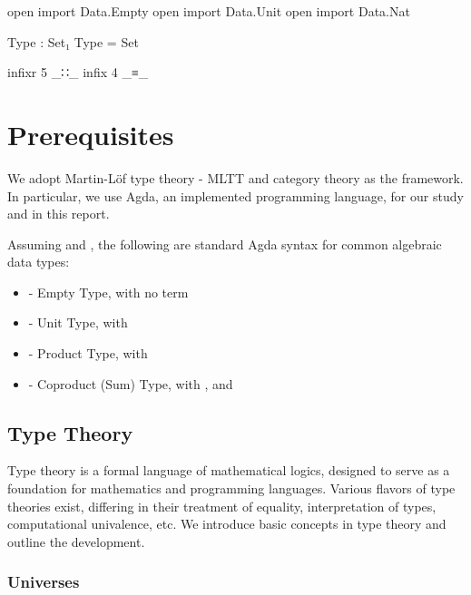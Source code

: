 \begin{code}[hide]
open import Data.Empty
open import Data.Unit
open import Data.Nat

Type : Set₁
Type = Set

infixr 5 _∷_
infix  4 _≡_
\end{code}

\chapter{Prerequisites}

We adopt Martin-L\"{o}f type theory - MLTT and category theory as the framework. In particular, we use Agda, an implemented programming language, for our study and in this report.

Assuming  \AgdaSymbol{:}  and  \AgdaSymbol{:} , the following are standard Agda syntax for common algebraic data types:

\begin{itemize}
  \item{ - Empty Type, with no term}
  \item{ - Unit Type, with  \AgdaSymbol{:} }
  \item{ - Product Type, with  \AgdaInductiveConstructor{,}  \AgdaSymbol{:}   }
  \item{ - Coproduct (Sum) Type, with   \AgdaSymbol{:}   , and   \AgdaSymbol{:}    }
\end{itemize}

\section{Type Theory}

Type theory is a formal language of mathematical logics, designed to serve as a foundation for mathematics and programming languages. Various flavors of type theories exist, differing in their treatment of equality, interpretation of types, computational univalence, etc. We introduce basic concepts in type theory and outline the development.

\subsection*{Universes}

